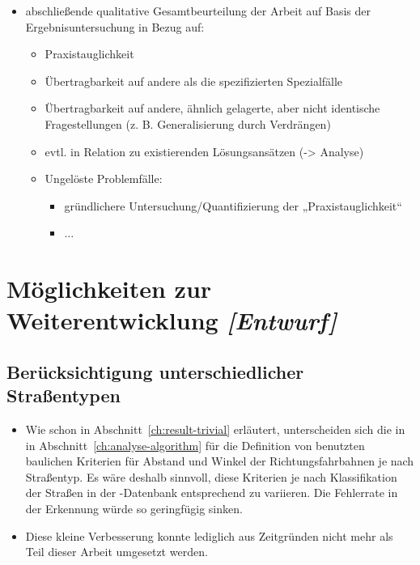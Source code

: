 \documentclass[../main/thesis.tex]{subfiles}
\begin{document}
\begin{itemize}
	\item abschließende qualitative Gesamtbeurteilung der Arbeit auf Basis der Ergebnisuntersuchung in Bezug auf:
	\begin{itemize}
		\item Praxistauglichkeit
		\item Übertragbarkeit auf andere als die spezifizierten Spezialfälle
		\item Übertragbarkeit auf andere, ähnlich gelagerte, aber nicht identische Fragestellungen (z. B. Generalisierung durch Verdrängen)
		\item evtl. in Relation zu existierenden Lösungsansätzen (-> Analyse)
		\item Ungelöste Problemfälle:
		\begin{itemize}
			\item gründlichere Untersuchung/Quantifizierung der „Praxistauglichkeit“
			\item ...
		\end{itemize}
	\end{itemize}
\end{itemize}



\section{Möglichkeiten zur Weiterentwicklung \emph{[Entwurf]}}



\subsection{Berücksichtigung unterschiedlicher Straßentypen}

\begin{itemize}

\item
Wie schon in Abschnitt~\ref{ch:result-trivial} erläutert, unterscheiden sich die in in Abschnitt~\ref{ch:analyse-algorithm} für die Definition von  benutzten baulichen Kriterien für Abstand und Winkel der Richtungsfahrbahnen je nach Straßentyp.
Es wäre deshalb sinnvoll, diese Kriterien je nach Klassifikation der Straßen in der \osm-Datenbank entsprechend zu variieren. Die Fehlerrate in der Erkennung würde so geringfügig sinken.

\item
Diese kleine Verbesserung konnte lediglich aus Zeitgründen nicht mehr als Teil dieser Arbeit umgesetzt werden.

\end{itemize}
\end{document}
